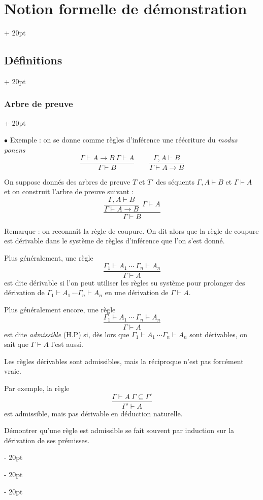 \documentclass[a4paper, 12pt, twoside]{article}
\newcommand{\ind}[1][20pt]{\advance\leftskip + #1}
\newcommand{\deind}[1][20pt]{\advance\leftskip - #1}
\newenvironment{indt}[2][20pt]{#2 \par \ind[#1]}{\par \deind} %
\begin{document}
\begin{indt}{\section{Notion formelle de démonstration}}
\begin{indt}{\subsection{Définitions}}
\begin{indt}{\subsubsection{Arbre de preuve}}
                \vspace{12pt}
                
                $\bullet$ Exemple : on se donne comme règles d'inférence une réécriture du \textit{modus ponens}
                \[
                    \dfrac{\Gamma \vdash A \rightarrow B\ \Gamma \vdash A}{\Gamma \vdash B}
                    \qquad
                    \dfrac{\Gamma, A \vdash B}{\Gamma \vdash A \rightarrow B}
                \]

                On suppose donnés des arbres de preuve $T$ et $T'$ des séquents $\Gamma, A \vdash B$ et $\Gamma \vdash A$ et on construit l'arbre de preuve suivant :
                \[
                    \dfrac
                    {
                        \dfrac{\Gamma, A \vdash B}{\Gamma \vdash A \rightarrow B}
                        \ \
                        \Gamma \vdash A
                    }
                    {\Gamma \vdash B}
                \]

                \vspace{6pt}
                
                Remarque : on reconnaît la règle de coupure. On dit alors que la règle de coupure est dérivable dans le système de règles d'inférence que l'on s'est donné.

                Plus généralement, une règle
                \[
                    \dfrac{\Gamma_1 \vdash A_1\ \cdots\ \Gamma_n \vdash A_n}{\Gamma \vdash A}
                \]
                est dite dérivable si l'on peut utiliser les règles su système pour prolonger des dérivation de $\Gamma_1 \vdash A_1\ \cdots \Gamma_n \vdash A_n$ en une dérivation de $\Gamma \vdash A$.

                Plus généralement encore, une règle
                \[
                    \dfrac{\Gamma_1 \vdash A_1\ \cdots\ \Gamma_n \vdash A_n}{\Gamma \vdash A}
                \]
                est dite \emph{admissible} (H.P) si, dès lors que $\Gamma_1 \vdash A_1\ \cdots \Gamma_n \vdash A_n$ sont dérivables, on sait que $\Gamma \vdash A$ l'est aussi.

                Les règles dérivables sont admissibles, mais la réciproque n'est pas forcément vraie.

                Par exemple, la règle
                \[
                    \dfrac{\Gamma \vdash A\ \Gamma \subseteq \Gamma'}{\Gamma' \vdash A}
                \]
                est admissible, mais pas dérivable en déduction naturelle.

                Démontrer qu'une règle est admissible se fait souvent par induction sur la dérivation de ses prémisses.
            \end{indt}
        \end{indt}
    \end{indt}
\end{document}
